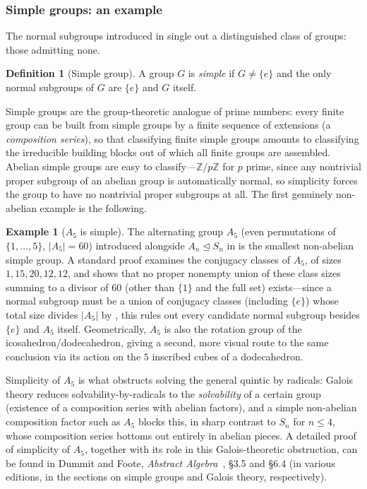 \documentclass[11pt]{article}
\theoremstyle{plain}
\theoremstyle{definition}
\newtheorem{Definition}{Definition}[section]
\newtheorem{Example}{Example}[section]
\begin{document}

\subsubsection{Simple groups: an example}
\label{subsubsec:simple-groups}

The normal subgroups introduced in  single out a
distinguished class of groups: those admitting none.

\begin{Definition}[Simple group]
\label{def:simple-group}
A group $G$ is \emph{simple} if $G \neq \{e\}$ and the only normal subgroups
of $G$ are $\{e\}$ and $G$ itself.
\end{Definition}

Simple groups are the group-theoretic analogue of prime numbers: every
finite group can be built from simple groups by a finite sequence of
extensions (a \emph{composition series}), so that classifying finite simple
groups amounts to classifying the irreducible building blocks out of which
all finite groups are assembled. Abelian simple groups are easy to
classify---$\mathbb{Z}/p\mathbb{Z}$ for $p$ prime, since any nontrivial
proper subgroup of an abelian group is automatically normal, so simplicity
forces the group to have no nontrivial proper subgroups at all. The first
genuinely non-abelian example is the following.

\begin{Example}[$A_5$ is simple]
\label{ex:A5-simple}
The alternating group $A_5$ (even permutations of $\{1,\dots,5\}$,
$|A_5| = 60$) introduced alongside $A_n \trianglelefteq S_n$ in
 is the smallest non-abelian simple group. A
standard proof examines the conjugacy classes of $A_5$, of sizes
$1, 15, 20, 12, 12$, and shows that no proper nonempty union of these class
sizes summing to a divisor of $60$ (other than $\{1\}$ and the full set)
exists---since a normal subgroup must be a union of conjugacy classes
(including $\{e\}$) whose total size divides $|A_5|$ by
, this rules out every candidate normal
subgroup besides $\{e\}$ and $A_5$ itself. Geometrically, $A_5$ is also the
rotation group of the icosahedron/dodecahedron, giving a second,
more visual route to the same conclusion via its action on the $5$
inscribed cubes of a dodecahedron.

Simplicity of $A_5$ is what obstructs solving the general quintic by
radicals: Galois theory reduces solvability-by-radicals to the
\emph{solvability} of a certain group (existence of a composition series
with abelian factors), and a simple non-abelian composition factor such as
$A_5$ blocks this, in sharp contrast to $S_n$ for $n \leq 4$, whose
composition series bottoms out entirely in abelian pieces. A detailed proof
of simplicity of $A_5$, together with its role in this Galois-theoretic
obstruction, can be found in Dummit and Foote,
\emph{Abstract Algebra}~\citep{dummit2003}, \S 3.5 and \S 6.4 (in various
editions, in the sections on simple groups and Galois theory,
respectively).
\end{Example}
\end{document}
